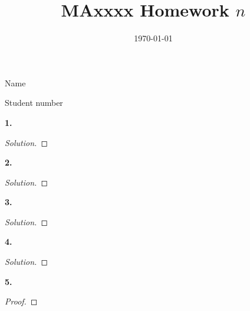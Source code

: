 \documentclass[12pt, reqno]{amsart}
\title{MAxxxx Homework $n$} %
\date{\today}
\newenvironment{statement}[1]{\smallskip\noindent\color[rgb]{0.00,0.00,1.00} {\bf #1.}}{}
\theoremstyle{definition}
\theoremstyle{remark}
\begin{document}
\maketitle

\vspace*{-0.25in}
\centerline{Name}
\centerline{Student number}
\vspace*{0.15in}

\begin{statement}{1}
	
\end{statement}

\begin{proof}[Solution]
    
\end{proof}

\begin{statement}{2}
	
\end{statement}

\begin{proof}[Solution]
	
\end{proof}

\begin{statement}{3}
	
\end{statement}

\begin{proof}[Solution]
	
\end{proof}

\begin{statement}{4}

\end{statement}

\begin{proof}[Solution]
	
\end{proof}

\begin{statement}{5}
	
\end{statement}

\begin{proof}
	
\end{proof}
\end{document}
